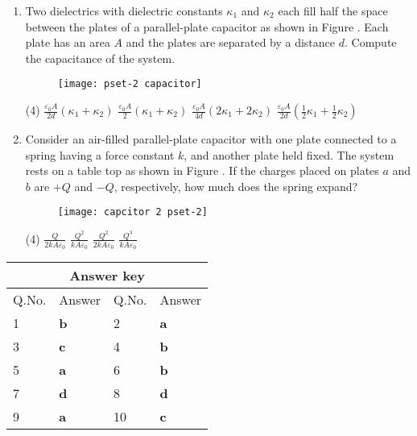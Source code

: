 \begin{enumerate} [label=\color{ocre}\textbf{\arabic*.}]
 \item  Two dielectrics with dielectric constants $\kappa_{1}$ and $\kappa_{2}$ each fill half the space between the plates of a parallel-plate capacitor as shown in Figure . Each plate has an area $A$ and the plates are separated by a distance $d$. Compute the capacitance of the system.
 \begin{figure}[H]
 	\centering
 	\texttt{[image: pset-2 capacitor]}
 	\label{pset-2 capacitor}
 \end{figure}
  \begin{tasks}(4)
 	\task[\textbf{a.}]$\frac{\varepsilon_{0} A}{2 d}\left(\kappa_{1}+\kappa_{2}\right)$
 	\task[\textbf{b.}]$\frac{\varepsilon_{0} A}{2 }\left(\kappa_{1}+\kappa_{2}\right) $
 	\task[\textbf{c.}]$\frac{\varepsilon_{0} A}{4 d}\left(2\kappa_{1}+2\kappa_{2}\right) $
 	\task[\textbf{d.}]$\frac{\varepsilon_{0} A}{2 d}\left(\frac{1}{2}\kappa_{1}+\frac{1}{2}\kappa_{2}\right) $
 \end{tasks} 
\item Consider an air-filled parallel-plate capacitor with one plate connected to a spring having a force constant $k$, and another plate held fixed. The system rests on a table top as shown in Figure . If the charges placed on plates $a$ and $b$ are $+Q$ and $-Q$, respectively, how much does the spring expand?
\begin{figure}[H]
	\centering
	\texttt{[image: capcitor 2 pset-2]}
	\label{capcitor 2 pset-2}
\end{figure}
\begin{tasks}(4)
	\task[\textbf{a.}]  $\frac{Q}{2 k A \varepsilon_{0}}$
	\task[\textbf{b.}]  $\frac{Q^{2}}{k A \varepsilon_{0}}$
	\task[\textbf{c.}]  $\frac{Q^{2}}{2 k A \varepsilon_{0}}$
	\task[\textbf{d.}]  $\frac{Q^{3}}{ k A \varepsilon_{0}}$
\end{tasks}
\end{enumerate}
\setlength\arrayrulewidth{1pt}
\begin{table}[H]
	\centering
	\begin{tabular}{|p{1.5cm}|p{1.5cm}||p{1.5cm}|p{1.5cm}|}
		\hline
		\multicolumn{4}{|c|}{\textbf{Answer key}}\\\hline\hline
		\rowcolor{ocrel}Q.No.&Answer&Q.No.&Answer\\\hline
		1&\textbf{b} &2&\textbf{a}\\\hline 
		3&\textbf{c} &4&\textbf{b} \\\hline
		5&\textbf{a} &6&\textbf{b} \\\hline
		7&\textbf{d}&8&\textbf{d}\\\hline
		9&\textbf{a}&10&\textbf{c}\\\hline
		
		
	\end{tabular}
\end{table}

